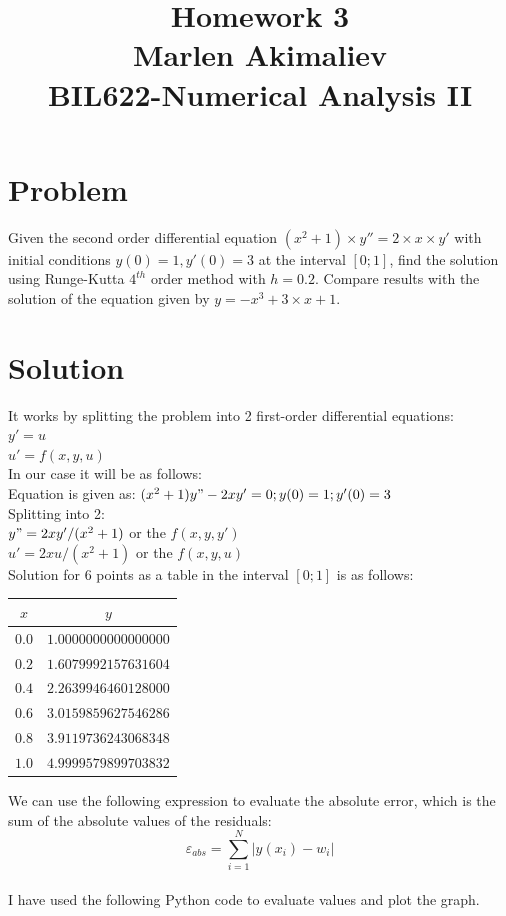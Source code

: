 \documentclass[a4paper,10pt]{article}
\date{\displaydate{date}}
\title{Homework 3\\Marlen Akimaliev\\BIL622-Numerical Analysis II}
\begin{document}
\maketitle

\section{Problem}
Given the second order differential equation $(x^2+1)\times y'' = 2 \times x \times y'$ with initial conditions $y(0)=1, y'(0)=3$ at the interval $[0;1]$, find the solution using Runge-Kutta $4^{th}$ order method with $h=0.2$. Compare results with the solution of the equation given by $y = -x^3+3 \times x +1$.
\section{Solution}
It works by splitting the problem into 2 first-order differential equations:\\
$y'=u$\\
$u'=f(x,y,u)$\\
In our case it will be as follows:\\
Equation is given as: $(x^2+1)y"-2xy'=0; y(0)=1;y'(0)=3$\\
Splitting into 2:\\
$y"=2xy'/(x^2+1)$ or the $f(x,y,y')$\\
$u'=2xu/(x^2+1)$ or the $f(x,y,u)$\\
Solution for 6 points as a table in the interval $[0; 1]$ is as follows:
\begin{center}
\begin{tabular}{ |c|c| } 
 \hline
 $x$ & $y$\\
\hline
 $0.0$ & $1.0000000000000000$\\
 $0.2$ & $1.6079992157631604$\\
 $0.4$ & $2.2639946460128000$\\
 $0.6$ & $3.0159859627546286$\\
 $0.8$ & $3.9119736243068348$\\
 $1.0$ & $4.9999579899703832$\\
 \hline
\end{tabular}
\end{center}
We can use the following expression to evaluate the absolute error, which is the sum of the absolute values of the residuals:\\
$$\varepsilon_{abs} = \sum_{i=1}^{N} |y(x_i)-w_i|$$\\
I have used the following Python code \cite{klopper} to evaluate values and plot the graph.
\end{document}
